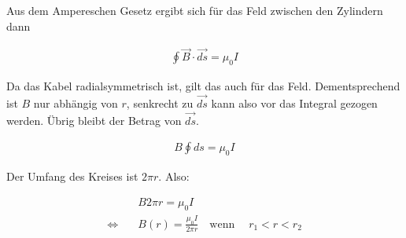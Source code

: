 \documentclass[a4paper,german,12pt,smallheadings]{scrartcl}
\begin{document}
Aus dem Ampereschen Gesetz ergibt sich für das Feld zwischen den Zylindern dann

\begin{align*}
  \oint \vec{B} \cdot \vec{ds} = \mu_0 I
\end{align*}

Da das Kabel radialsymmetrisch ist, gilt das auch für das Feld. Dementsprechend
ist $B$ nur abhängig von $r$, senkrecht zu $\vec{ds}$ kann also vor das
Integral gezogen werden. Übrig bleibt der Betrag von $\vec{ds}$.

\begin{align*}
  B \oint ds = \mu_0 I
\end{align*}

Der Umfang des Kreises ist $2 \pi r$. Also:

\begin{align*}
  &B 2 \pi r = \mu_0 I \\
  \Leftrightarrow\quad &B(r) = \frac{\mu_0 I}{2 \pi r} \quad \text{wenn}\quad\; r_1 < r < r_2
\end{align*}
\end{document}
